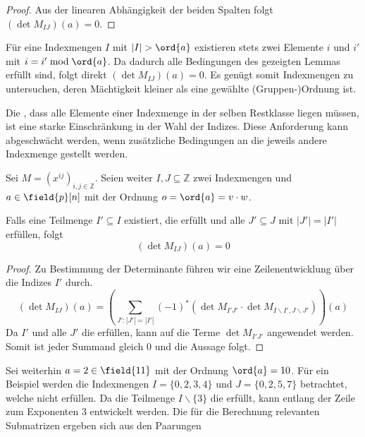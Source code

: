 {\begin{proof}
    Aus der linearen Abhängigkeit der beiden Spalten folgt $(\det M_{IJ})(a) = 0$.
\end{proof}

Für eine Indexmengen $I$ mit $|I| > \ord{a}$ existieren stets zwei Elemente $i$ und $i'$ mit $i = i' \bmod \ord{a}$. Da dadurch alle Bedingungen des gezeigten Lemmas erfüllt sind, folgt direkt $(\det M_{IJ})(a) = 0$. Es genügt somit Indexmengen zu untersuchen, deren Mächtigkeit kleiner als eine gewählte (Gruppen-)Ordnung ist.

Die , dass alle Elemente einer Indexmenge in der selben Restklasse liegen müssen, ist eine starke Einschränkung in der Wahl der Indizes. Diese Anforderung kann abgeschwächt werden, wenn zusätzliche Bedingungen an die jeweils andere Indexmenge gestellt werden.

\begin{satz} \label{satz:equal-columns-subs}
    Sei $M = \left( x^{ij} \right)_{i,j \in \mathbb{Z}}$. Seien weiter $I,J \subseteq \mathbb{Z}$ zwei Indexmengen und $a \in \field{p}[n]$ mit der Ordnung $o = \ord{a} = v\cdot w$.

    Falls eine Teilmenge $I' \subseteq I$ existiert, die  erfüllt und alle $J' \subseteq J$ mit $|J'| = |I'|$  erfüllen, folgt
    \begin{equation*}
        (\det M_{IJ})(a) = 0
    \end{equation*}
\end{satz}

\begin{proof}
    Zu Bestimmung der Determinante führen wir eine Zeilenentwicklung über die Indizes $I'$ durch. 
\begin{equation*}
    (\det M_{IJ})(a) = \left( \sum_{J':|J'| = |I'|} (-1)^{\ast} \left( \det M_{I'J'} \cdot \det M_{I\backslash I',J\backslash J'} \right) \right)(a) %
\end{equation*}
Da $I'$ und alle $J'$ die  erfüllen, kann  auf die Terme $\det M_{I'J'}$ angewendet werden. Somit ist jeder Summand gleich $0$ und die Aussage folgt.
\end{proof}

Sei weiterhin $a = 2 \in \field{11}$ mit der Ordnung $\ord{a} = 10$. Für ein Beispiel werden die Indexmengen $I = \{0,2,3,4\}$ und $J = \{0,2,5,7\}$ betrachtet, welche  nicht erfüllen. Da die Teilmenge $I\backslash\{3\}$ die  erfüllt, kann entlang der Zeile zum Exponenten $3$ entwickelt werden. Die für die Berechnung relevanten Submatrizen ergeben sich aus den Paarungen

}
